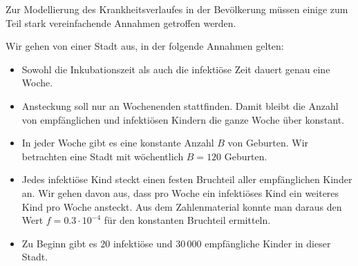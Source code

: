 \documentclass[%
11pt,%
twoside,%
titlepage,%
german,%
headsepline%
]{scrartcl}
\begin{document}
\begin{center}
\end{center}


Zur Modellierung des Krankheitsverlaufes in der Bevölkerung müssen einige zum Teil stark vereinfachende Annahmen getroffen werden.

Wir gehen von einer Stadt aus, in der folgende Annahmen gelten:

\begin{itemize}
\item Sowohl die Inkubationszeit als auch die infektiöse Zeit dauert genau eine Woche.
\item Ansteckung soll nur an Wochenenden stattfinden. Damit bleibt die Anzahl von empfänglichen und infektiösen Kindern die ganze Woche über konstant.
\item In jeder Woche gibt es eine konstante Anzahl $B$ von Geburten. Wir betrachten eine Stadt mit wöchentlich $B=120$ Geburten.
\item Jedes infektiöse Kind steckt einen festen Bruchteil aller empfänglichen Kinder an. Wir gehen davon aus, dass pro Woche ein infektiöses Kind ein weiteres Kind pro Woche ansteckt. Aus dem Zahlenmaterial konnte man daraus den Wert $f=0.3\cdot10^{-4}$ für den konstanten Bruchteil ermitteln.
\item Zu Beginn gibt es $20$ infektiöse und $30\,000$ empfängliche Kinder in dieser
Stadt.
\end{itemize}
\end{document}
